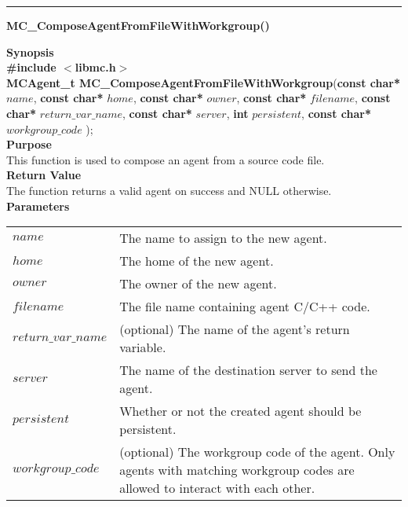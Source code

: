 \noindent
\vspace{5pt}
\rule{6.5in}{0.015in}
\noindent
{}
{\LARGE \bf MC\_ComposeAgentFromFileWithWorkgroup()} \\

\noindent
{\bf Synopsis}\\
{\bf \#include $<$libmc.h$>$}\\
{\bf MCAgent\_t MC\_ComposeAgentFromFileWithWorkgroup}({\bf const char*} $name$, 
                                  {\bf const char*} $home$,
                                  {\bf const char*} $owner$,
                                  {\bf const char*} $filename$,
                                  {\bf const char*} $return\_var\_name$,
                                  {\bf const char*} $server$,
                                  {\bf int} $persistent$,
                                  {\bf const char*} $workgroup\_code$
																	);\\

\noindent
{\bf Purpose}\\
This function is used to compose an agent from a source code file.\\

\noindent
{\bf Return Value}\\
The function returns a valid agent on success and NULL otherwise.\\

\noindent
{\bf Parameters}
\vspace{-0.1in}
\begin{description}
\item
\begin{tabular}{p{30 mm}p{125 mm}} 
$name$ & The name to assign to the new agent.\\
$home$ & The home of the new agent.\\
$owner$ & The owner of the new agent.\\
$filename$ & The file name containing agent C/C++ code.\\
$return\_var\_name$ & (optional) The name of the agent's return variable.\\
$server$ & The name of the destination server to send the agent.\\
$persistent$ & Whether or not the created agent should be persistent.\\
$workgroup\_code$ & (optional) The workgroup code of the agent. Only agents with matching workgroup codes are allowed to interact with each other.\\
\end{tabular}
\end{description}

